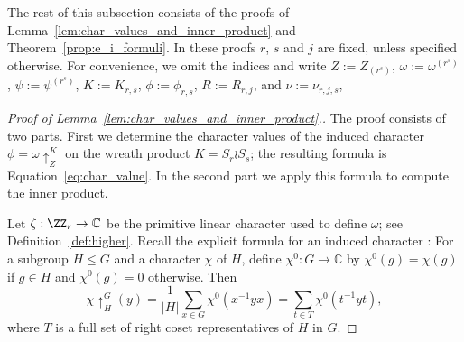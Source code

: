 The rest of this subsection consists of the proofs of Lemma~\ref{lem:char_values_and_inner_product} 
and Theorem~\ref{prop:e_i_formuli}. 
In these proofs 
$r$, $s$ and $j$ are fixed, unless specified otherwise. 
For convenience, we omit the indices and write 
$Z := Z_{(r^s)}$, 
$\omega := \omega^{(r^s)}$, 
$\psi := \psi^{(r^s)}$, 
$K := K_{r,s}$, 
$\phi := \phi_{r,s}$, 
$R := R_{r,j}$, and
$\nu := \nu_{r,j,s}$, 

\begin{proof}[Proof of  Lemma~\ref{lem:char_values_and_inner_product}.]
    The proof consists of two parts. 
    First we determine the character values of the induced character $\phi = \omega\uparrow_Z^K$ on the wreath product $K=S_r\wr S_{s}$; the resulting formula is Equation~\eqref{eq:char_value}. In the second part we 
    apply this formula to compute the inner product.
		
    Let $\zeta: \ZZ_r \to \mathbb{C}$ be the primitive linear character used to define $\omega$; see Definition~\ref{def:higher}. 
    Recall the explicit formula for an induced character \cite[(5.1)]{Isaacs}: 
    For a subgroup $H\leq G$ and a character $\chi$ of $H$, define $\chi^0 : G \to \mathbb{C}$ by $\chi^0(g) = \chi(g)$ if $g\in H$ and $\chi^0(g) = 0$ otherwise. Then
    \begin{equation}\label{eq:induction}
        \chi\uparrow_H^G(y)
        = \frac{1}{|H|} \sum_{x\in G} \chi^0(x^{-1}yx)
        = \sum_{t\in T} \chi^0(t^{-1}yt),
    \end{equation}
    where $T$ is a full set of right coset representatives of $H$ in $G$.
		

\end{proof}
